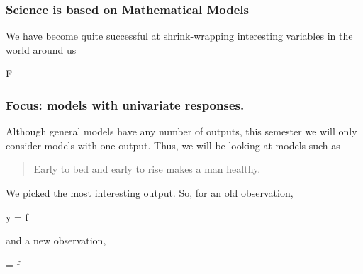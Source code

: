 \documentclass[slides]{beamer} %
\begin{document}
\begin{frame}\frametitle{Science is based on Mathematical Models}

We have become quite successful at shrink-wrapping interesting variables in the world around us

\beqn
F
\eeqn
	
\end{frame}


\begin{frame}\frametitle{Focus: models with univariate responses.}

Although general models have any number of outputs, this semester we will only consider models with one output. Thus, we will be looking at models such as

\begin{quotation}
Early to bed and early to rise makes a man healthy.
\end{quotation}

We picked the most interesting output. So, for an old observation,

\beqn
y = f 
\eeqn

and a new observation,

\beqn
\yhat = f 
\eeqn
	
\end{frame}
\end{document}
